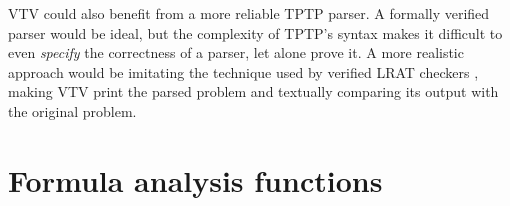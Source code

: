 \documentclass{lipics-v2021}
\begin{document}
VTV could also benefit from a more reliable TPTP parser. A formally verified 
parser would be ideal, but the complexity of TPTP's syntax makes it difficult  
to even \textit{specify} the correctness of a parser, let alone prove it. 
A more realistic approach would be imitating the technique used by verified 
LRAT checkers \cite{heule2017efficient}, making VTV print the parsed problem 
and textually comparing its output with the original problem.








\appendix  

\section{Formula analysis functions} \label{apdx:faf}


\end{document}

